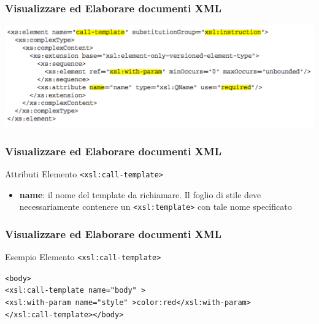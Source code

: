 \begin{frame}
    \frametitle{Visualizzare ed Elaborare documenti XML}
    \addtocounter{nframe}{1}
    
    \begin{center}
        \includegraphics[width=.9\textwidth]{imgs/Schema-call-template.png}
    \end{center}

\end{frame}

\begin{frame}
    \frametitle{Visualizzare ed Elaborare documenti XML}
    \addtocounter{nframe}{1}
    

     \begin{block}{Attributi Elemento \texttt{<xsl:call-template>}}
         \begin{itemize}
             \item \textbf{name}: il nome del template da richiamare. Il foglio di stile deve necessariamente contenere un \texttt{<xsl:template>} con tale nome specificato
        \end{itemize}
     \end{block}
    
\end{frame}

\begin{frame}
    \frametitle{Visualizzare ed Elaborare documenti XML}
    \addtocounter{nframe}{1}
    

     \begin{block}{Esempio Elemento \texttt{<xsl:call-template>}}
        
        \texttt{<body>}
        \\\texttt{<xsl:call-template name="body" >}
        \\\texttt{<xsl:with-param name="style" >color:red</xsl:with-param>}
        \\\texttt{</xsl:call-template></body>}

     \end{block}
\end{frame}


